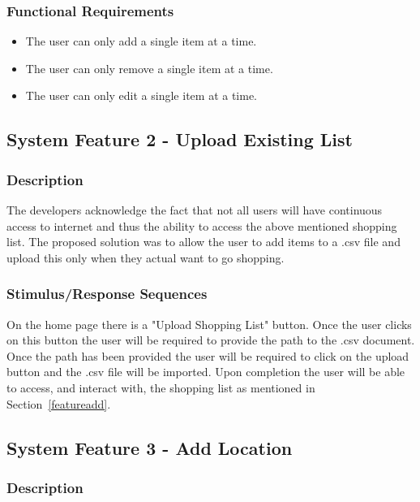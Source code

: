 \documentclass[10pt, a4paper, twocolumn]{scrartcl}
\begin{document}
			\subsubsection{Functional Requirements}
	
				\begin{itemize}
					\item The user can only add a single item at a time.
					\item The user can only remove a single item at a time.
					\item The user can only edit a single item at a time.
				\end{itemize}
	
		\subsection{System Feature 2 - Upload Existing List}
	
			\subsubsection{Description}
			
				The developers acknowledge the fact that not all users will have continuous access to internet and thus the ability to access the above mentioned shopping list. The proposed solution was to allow the user to add items to a .csv file and upload this only when they actual want to go shopping. 
	
			\subsubsection{Stimulus/Response Sequences}
	
				On the home page there is a "Upload Shopping List" button. Once the user clicks on this button the user will be required to provide the path to the .csv document. Once the path has been provided the user will be required to click on the upload button and the .csv file will be imported. Upon completion the user will be able to access, and interact with, the shopping list as mentioned in Section~\ref{featureadd}.
	
		\subsection{System Feature 3 - Add Location}
	
			\subsubsection{Description}
	
\end{document}
